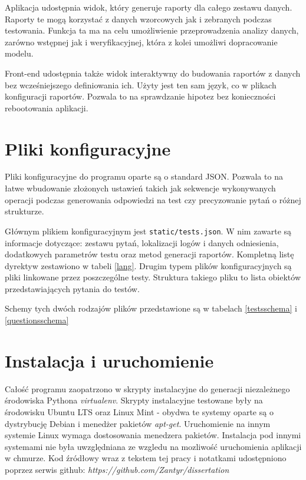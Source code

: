 \documentclass[12pt,a4paper,oneside]{report} %
\begin{document}
Aplikacja udostępnia widok, który generuje raporty dla całego zestawu danych. Raporty te mogą korzystać z danych wzorcowych jak i zebranych podczas testowania. Funkcja ta ma na celu umożliwienie przeprowadzenia analizy danych, zarówno wstępnej jak i weryfikacyjnej, która z kolei umożliwi dopracowanie modelu.\par

Front-end udostępnia także widok interaktywny do budowania raportów z danych bez wcześniejszego definiowania ich. Użyty jest ten sam język, co w plikach konfiguracji raportów. Pozwala to na sprawdzanie hipotez bez konieczności rebootowania aplikacji.\par

\section{Pliki konfiguracyjne}

Pliki konfiguracyjne do programu oparte są o standard JSON. Pozwala to na łatwe wbudowanie złożonych ustawień takich jak sekwencje wykonywanych operacji podczas generowania odpowiedzi na test czy precyzowanie pytań o różnej strukturze.\par

Głównym plikiem konfiguracyjnym jest \texttt{static/tests.json}. W nim zawarte są informacje dotyczące: zestawu pytań, lokalizacji logów i danych odniesienia, dodatkowych parametrów testu oraz metod generacji raportów. Kompletną listę dyrektyw zestawiono w tabeli \ref{lang}. Drugim typem plików konfiguracyjnych są pliki linkowane przez poszczególne testy. Struktura takiego pliku to lista obiektów przedstawiających pytania do testów.\par

Schemy tych dwóch rodzajów plików przedstawione są w tabelach \ref{testsschema} i \ref{questionsschema}

\section{Instalacja i uruchomienie}

Całość programu zaopatrzono w skrypty instalacyjne do generacji niezależnego środowiska Pythona \emph{virtualenv}. Skrypty instalacyjne testowane były na środowisku Ubuntu LTS oraz Linux Mint - obydwa te systemy oparte są o dystrybucję Debian i menedżer pakietów \emph{apt-get}. Uruchomienie na innym systemie Linux wymaga dostosowania menedzera pakietów. Instalacja pod innymi systemami nie była uwzględniana ze wzgledu na mozliwość uruchomienia aplikacji w chmurze.  Kod źródłowy wraz z tekstem tej pracy i notatkami udostępniono poprzez serwis github: \emph{https://github.com/Zantyr/dissertation}\par
\end{document}
